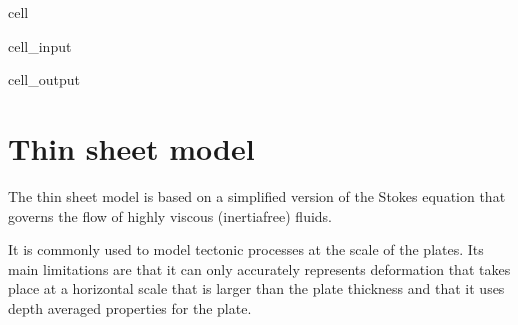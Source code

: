 \documentclass[letterpaper,10pt,english]{jupyterBook}
\begin{document}
\begin{sphinxuseclass}{cell}\begin{sphinxVerbatimInput}

\begin{sphinxuseclass}{cell_input}
\begin{sphinxVerbatim}[commandchars=\\\{\}]
   
\end{sphinxVerbatim}

\end{sphinxuseclass}\end{sphinxVerbatimInput}
\begin{sphinxVerbatimOutput}

\begin{sphinxuseclass}{cell_output}
\noindent{}

\end{sphinxuseclass}\end{sphinxVerbatimOutput}

\end{sphinxuseclass}
\sphinxstepscope


\section{Thin sheet model}
\label{\detokenize{thinsheet:thin-sheet-model}}\label{\detokenize{thinsheet:thin-sheet-section}}\label{\detokenize{thinsheet::doc}}
\sphinxAtStartPar
The thin sheet model is based on a simplified version of the Stokes equation that governs the flow of highly viscous (inertia\sphinxhyphen{}free) fluids.

\sphinxAtStartPar
It is commonly used to model tectonic processes at the scale of the plates. Its main limitations are that it can only  accurately represents deformation that takes place at a horizontal scale that is larger than the plate thickness and that it uses depth averaged properties for the plate.
\end{document}
